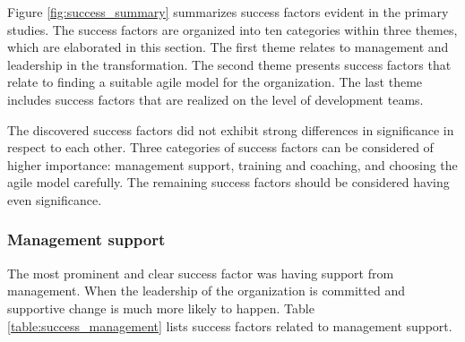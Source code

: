 Figure \ref{fig:success_summary} summarizes success factors evident in the
primary studies. The success factors are organized into ten categories within
three themes, which are elaborated in this section. The first theme relates to
management and leadership in the transformation. The second theme presents
success factors that relate to finding a suitable agile model for the
organization. The last theme includes success factors that are realized on the
level of development teams.

The discovered success factors did not exhibit strong differences in
significance in respect to each other. Three categories of success factors can
be considered of higher importance: management support, training and coaching,
and choosing the agile model carefully. The remaining success factors should be
considered having even significance.

% 
% 
% 


\subsubsection{Management support}

The most prominent and clear success factor was having support from management.
When the leadership of the organization is committed and supportive change is
much more likely to happen. Table \ref{table:success_management} lists
success factors related to management support.

